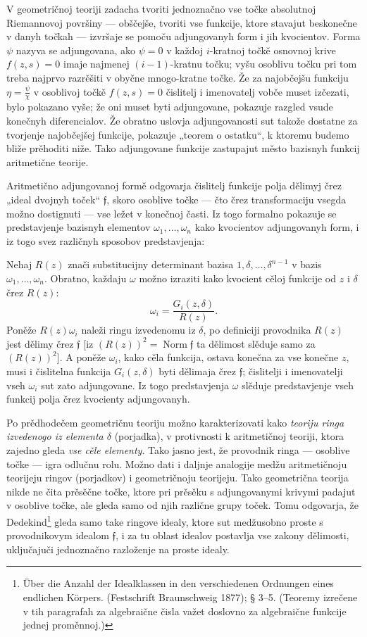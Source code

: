 \documentclass[11pt]{article}
\providecommand{\frf}{\mathfrak f}
\begin{document}
V geometričnoj teoriji zadacha tvoriti jednoznačno vse točke absolutnoj Riemannovoj površiny --- obščejše, tvoriti vse funkcije, ktore stavajut beskonečne v danyh točkah --- izvršaje se pomoču adjungovanyh form i jih kvocientov. Forma \(\psi\) nazyva se adjungovana, ako \(\psi=0\) v každoj \(i\)-kratnoj točkě osnovnoj krive \(f(z,s)=0\) imaje najmenej \((i-1)\)-kratnu točku; vyšu osoblivu točku pri tom treba najprvo razrěšiti v obyčne mnogo-kratne točke. Že za najobčejšu funkciju \(\eta=\frac{\psi}{\chi}\) v osoblivoj točkě \(f(z,s)=0\) čislitelj i imenovatelj vobče muset izčezati, bylo pokazano vyše; že oni muset byti adjungovane, pokazuje razgled vsude konečnyh diferencialov. Že obratno uslovja adjungovanosti sut takože dostatne za tvorjenje najobčejšej funkcije, pokazuje „teorem o ostatku“, k ktoremu budemo bliže prěhoditi niže. Tako adjungovane funkcije zastupajut město bazisnyh funkcij aritmetične teorije.

Aritmetično adjungovanoj formě odgovarja čislitelj funkcije polja dělimyj črez „ideal dvojnyh toček“ \(\frf\), skoro osoblive točke --- čto črez transformaciju vsegda možno dostignuti --- vse ležet v konečnoj časti. Iz togo formalno pokazuje se predstavjenje bazisnyh elementov \(\omega_1,\ldots,\omega_n\) kako kvocientov adjungovanyh form, i iz togo svez različnyh sposobov predstavjenja:

Nehaj \(R(z)\) znači substitucijny determinant bazisa \(1,\delta,\ldots,\delta^{n-1}\) v bazis \(\omega_1,\ldots,\omega_n\). Obratno, každaju \(\omega\) možno izraziti kako kvocient cěloj funkcije od \(z\) i \(\delta\) črez \(R(z)\):
\[
\omega_i=\frac{G_i(z,\delta)}{R(z)}.
\]
Poněže \(R(z)\omega_i\) naleži ringu izvedenomu iz \(\delta\), po definiciji provodnika \(R(z)\) jest dělimy črez \(\frf\) [iz \((R(z))^2=\operatorname{Norm}\frf\) ta dělimost slěduje samo za \((R(z))^2\)]. A poněže \(\omega_i\), kako cěla funkcija, ostava konečna za vse konečne \(z\), musi i čislitelna funkcija \(G_i(z,\delta)\) byti dělimaja črez \(\frf\); čislitelji i imenovatelji vseh \(\omega_i\) sut zato adjungovane. Iz togo predstavjenja \(\omega\) slěduje predstavjenje vseh funkcij polja črez kvocienty adjungovanyh.

Po prědhodečem geometričnu teoriju možno karakterizovati kako {\itshape teoriju ringa izvedenogo iz elementa \(\delta\)} (porjadka), v protivnosti k aritmetičnoj teoriji, ktora zajedno gleda {\itshape vse cěle elementy}. Tako jasno jest, že provodnik ringa --- osoblive točke --- igra odlučnu rolu. Možno dati i daljnje analogije medžu aritmetičnoju teorijeju ringov (porjadkov) i geometričnoju teorijeju. Tako geometrična teorija nikde ne čita prěsěčne točke, ktore pri prěsěku s adjungovanymi krivymi padajut v osoblive točke, ale gleda samo od njih različne grupy toček. Tomu odgovarja, že Dedekind\footnote{Über die Anzahl der Idealklassen in den verschiedenen Ordnungen eines endlichen Körpers. (Festschrift Braunschweig 1877); § 3--5. (Teoremy izrečene v tih paragrafah za algebraične čisla važet doslovno za algebraične funkcije jednej proměnnoj.)} gleda samo take ringove idealy, ktore sut medžusobno proste s provodnikovym idealom \(\frf\), i za tu oblast idealov postavlja vse zakony dělimosti, uključajuči jednoznačno razloženje na proste idealy.
\end{document}
